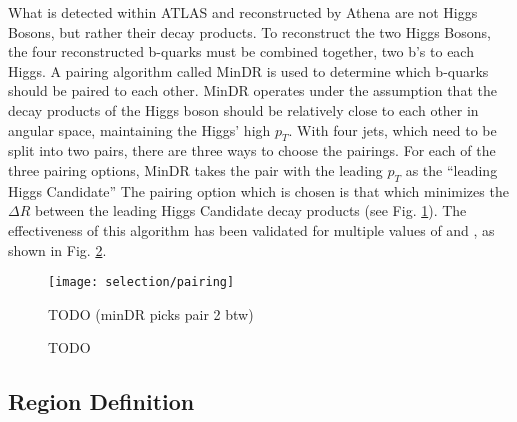         What is detected within ATLAS and reconstructed by Athena are not Higgs Bosons, but rather their decay products.
        To reconstruct the two Higgs Bosons, the four reconstructed b-quarks must be combined together, two b's to each Higgs.
        A pairing algorithm called MinDR\cite{hh4b_2021_int_note}
            is used to determine which b-quarks should be paired to each other.
        MinDR operates under the assumption that the decay products of the Higgs boson
            should be relatively close to each other in angular space, maintaining the Higgs' high $p_T$.
        With four jets, which need to be split into two pairs, there are three ways to choose the pairings.
        For each of the three pairing options, MinDR takes the pair with the leading $p_T$ as the ``leading Higgs Candidate''
        The pairing option which is chosen is that which minimizes the $\Delta R$ between the leading Higgs Candidate decay products
            (see Fig. \ref{fig:minDR_pairing_diagram}).
        The effectiveness of this algorithm has been validated for multiple values of \kvv and \kl,
            as shown in Fig. \ref{fig:HHpairing}.

        \begin{figure}[tbh]
            \texttt{[image: selection/pairing]}
            \caption{
                TODO (minDR picks pair 2 btw)\cite{hh4b_2021_int_note}
            }
            \label{fig:minDR_pairing_diagram}
        \end{figure}

        \begin{figure}[hbt]
            \centering
            \caption{TODO \cite{hh4b_2021_int_note}}
            \label{fig:HHpairing}
        \end{figure}
                                                                                                         
        \FloatBarrier


    \subsection{Region Definition}
        
